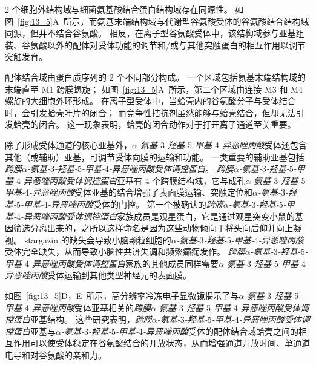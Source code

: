 2 个细胞外结构域与细菌氨基酸结合蛋白结构域存在同源性。
如图~\ref{fig:13_5}A~所示，而氨基末端结构域与代谢型谷氨酸受体的谷氨酸结合结构域同源，但并不结合谷氨酸。
相反，在离子型谷氨酸受体中，该结构域参与亚基组装、谷氨酸以外的配体对受体功能的调节和/或与其他突触蛋白的相互作用以调节突触发育。


配体结合域由蛋白质序列的 2 个不同部分构成。
一个区域包括氨基末端结构域的末端直至 M1 跨膜螺旋；
如图~\ref{fig:13_5}A~所示，第二个区域由连接 M3 和 M4 螺旋的大细胞外环形成。
在离子型受体中，当蛤壳内的谷氨酸分子与受体结合时，会引发蛤壳叶片的闭合；
而竞争性拮抗剂虽然能够与蛤壳结合，但却无法引发蛤壳的闭合。
这一现象表明，蛤壳的闭合动作对于打开离子通道至关重要。


除了形成受体通道的核心亚基外，\textit{$\alpha$-氨基-}3\textit{-羟基-}5\textit{-甲基-}4\textit{-异恶唑丙酸}受体还包含其他（或辅助）亚基，可调节受体向膜的运输和功能。
一类重要的辅助亚基包括\textit{跨膜$\alpha$-氨基-}3\textit{-羟基-}5\textit{-甲基-}4\textit{-异恶唑丙酸受体调控蛋白}。
\textit{跨膜$\alpha$-氨基-}3\textit{-羟基-}5\textit{-甲基-}4\textit{-异恶唑丙酸受体调控蛋白}亚基有 4 个跨膜结构域，它与成孔\textit{$\alpha$-氨基-}3\textit{-羟基-}5\textit{-甲基-}4\textit{-异恶唑丙酸}受体亚基的结合增强了表面膜运输、突触定位和\textit{$\alpha$-氨基-}3\textit{-羟基-}5\textit{-甲基-}4\textit{-异恶唑丙酸}受体的门控。
第一个被确认的\textit{跨膜$\alpha$-氨基-}3\textit{-羟基-}5\textit{-甲基-}4\textit{-异恶唑丙酸受体调控蛋白}家族成员是观星蛋白，它是通过观星突变小鼠的基因筛选分离出来的，之所以这样命名是因为这些动物倾向于将头向后仰并向上凝视。
stargazin 的缺失会导致小脑颗粒细胞的\textit{$\alpha$-氨基-}3\textit{-羟基-}5\textit{-甲基-}4\textit{-异恶唑丙酸}受体完全缺失，从而导致小脑性共济失调和频繁癫痫发作。
\textit{跨膜$\alpha$-氨基-}3\textit{-羟基-}5\textit{-甲基-}4\textit{-异恶唑丙酸受体调控蛋白}家族的其他成员同样需要\textit{$\alpha$-氨基-}3\textit{-羟基-}5\textit{-甲基-}4\textit{-异恶唑丙酸}受体运输到其他类型神经元的表面膜。


如图~\ref{fig:13_5}D，E~所示，高分辨率冷冻电子显微镜揭示了与\textit{$\alpha$-氨基-}3\textit{-羟基-}5\textit{-甲基-}4\textit{-异恶唑丙酸}受体亚基相关的\textit{跨膜$\alpha$-氨基-}3\textit{-羟基-}5\textit{-甲基-}4\textit{-异恶唑丙酸受体调控蛋白}亚基结构。
这些研究表明，\textit{跨膜$\alpha$-氨基-}3\textit{-羟基-}5\textit{-甲基-}4\textit{-异恶唑丙酸受体调控蛋白}亚基与\textit{$\alpha$-氨基-}3\textit{-羟基-}5\textit{-甲基-}4\textit{-异恶唑丙酸}受体的配体结合域蛤壳之间的相互作用可以使受体稳定在谷氨酸结合的开放状态，从而增强通道开放时间、单通道电导和对谷氨酸的亲和力。


